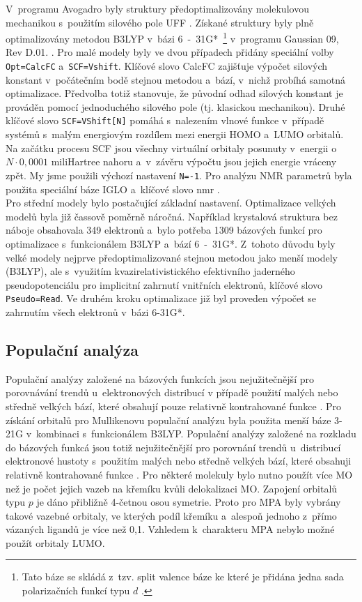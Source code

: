 \documentclass[
digital, %
table,   %
nolof,     %
nolot,     %
oneside,
]{fithesis3}
\begin{document}
V~programu Avogadro byly struktury předoptimalizovány molekulovou mechanikou s~použitím silového pole UFF \cite{uff_force_filed}. Získané struktury byly plně optimalizovány metodou B3LYP \cite{b3lyp} v~bázi 6~-~31G*~\footnote{Tato báze se skládá z~tzv. split valence báze \cite{ditchfield1971self} ke které je přidána jedna sada polarizačních funkcí typu $d$ \cite{francl1982self}.} v~programu Gaussian 09, Rev D.01. \cite{g09}. Pro malé modely byly ve dvou případech přidány speciální volby \texttt{Opt=CalcFC} a~\texttt{SCF=Vshift}. Klíčové slovo CalcFC zajišťuje výpočet silových konstant v~počátečním bodě stejnou metodou a~bází, v~nichž probíhá samotná optimalizace. Předvolba totiž stanovuje, že původní odhad silových konstant je prováděn pomocí jednoduchého silového pole (tj. klasickou mechanikou). Druhé klíčové slovo \texttt{SCF=VShift[N]} pomáhá s~nalezením vlnové funkce v~případě systémů s~malým energiovým rozdílem mezi energii HOMO a~LUMO orbitalů. Na začátku procesu SCF jsou všechny virtuální orbitaly posunuty v~energii o~$N \cdot 0,0001$ miliHartree nahoru a~v~závěru výpočtu jsou jejich energie vráceny zpět. My jsme použili výchozí nastavení \texttt{N=-1}. Pro analýzu NMR parametrů byla použita speciální báze IGLO \cite{iglo} a~klíčové slovo nmr \cite{g09}. \\
Pro střední modely bylo postačující základní nastavení. Optimalizace velkých modelů byla již čassově poměrně náročná. Například krystalová struktura bez náboje obsahovala 349 elektronů a~bylo potřeba 1309 bázových funkcí pro optimalizace s~funkcionálem B3LYP a~bází 6~-~31G*. Z~tohoto důvodu byly velké modely nejprve předoptimalizované stejnou metodou jako menší modely (B3LYP), ale s~využitím kvazirelativistického efektivního jaderného pseudopotenciálu pro implicitní zahrnutí vnitřních elektronů, klíčové slovo \texttt{Pseudo=Read}. Ve druhém kroku optimalizace již byl proveden výpočet se zahrnutím všech elektronů v~bázi 6-31G*.\\
\subsection{Populační analýza}
Populační analýzy založené na bázových funkcích jsou nejužitečnější pro porovnávání trendů u~elektronových distribucí v případě použití malých nebo středně velkých bází, které obsahují pouze relativně kontrahované funkce \cite{jensen2007introduction}.
Pro získání orbitalů pro Mullikenovu populační analýzu byla použita menší báze 3-21G \cite{binkley1980self} v~kombinaci s~funkcionálem B3LYP. Populační analýzy založené na rozkladu do bázových funkcá jsou totiž nejužitečnější pro porovnání trendů u~distribucí elektronové hustoty s~použitím malých nebo středně velkých bází, které obsahuji relativně kontrahované funkce \cite{jensen2007introduction}. Pro některé molekuly bylo nutno použít více MO než je počet
jejich vazeb na křemíku kvůli delokalizaci MO. Zapojení orbitalů typu $p$ je dáno
přibližně 4-četnou osou symetrie. Proto pro MPA byly
vybrány takové vazebné orbitaly, ve kterých podíl křemíku a~alespoň
jednoho z~přímo vázaných ligandů je více než 0,1. Vzhledem k~charakteru
MPA nebylo možné použít orbitaly LUMO. \\
\end{document}

